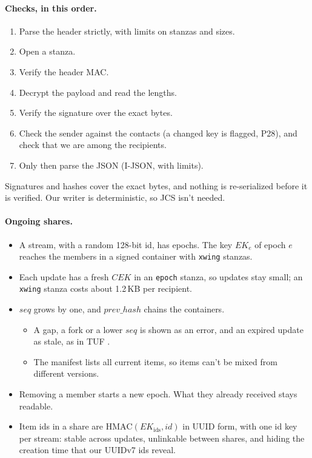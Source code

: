 \documentclass[11pt,a4paper]{article}
\newcommand{\dref}[1]{\textsf{#1}} %
\begin{document}
\paragraph{Checks, in this order.}
\begin{enumerate}
  \item Parse the header strictly, with limits on stanzas and sizes.
  \item Open a stanza.
  \item Verify the header MAC.
  \item Decrypt the payload and read the lengths.
  \item Verify the signature over the exact bytes.
  \item Check the sender against the contacts (a changed key is flagged, \dref{P28}), and check that we are among the recipients.
  \item Only then parse the JSON (I-JSON, with limits).
\end{enumerate}
Signatures and hashes cover the exact bytes, and nothing is re-serialized before it is verified. Our writer is deterministic, so JCS isn't needed.

\paragraph{Ongoing shares.}
\begin{itemize}
  \item A stream, with a random 128-bit id, has epochs. The key $\mathit{EK}_e$ of epoch $e$ reaches the members in a signed container with \texttt{xwing} stanzas.
  \item Each update has a fresh $\mathit{CEK}$ in an \texttt{epoch} stanza, so updates stay small; an \texttt{xwing} stanza costs about 1.2\,KB per recipient.
  \item $\mathit{seq}$ grows by one, and $\mathit{prev\_hash}$ chains the containers.
  \begin{itemize}
    \item A gap, a fork or a lower $\mathit{seq}$ is shown as an error, and an expired update as stale, as in TUF \cite{tuf}.
    \item The manifest lists all current items, so items can't be mixed from different versions.
  \end{itemize}
  \item Removing a member starts a new epoch. What they already received stays readable.
  \item Item ids in a share are $\mathrm{HMAC}(\mathit{EK}_{\mathrm{ids}}, \mathit{id})$ in UUID form, with one id key per stream: stable across updates, unlinkable between shares, and hiding the creation time that our UUIDv7 ids reveal.
\end{itemize}
\end{document}
